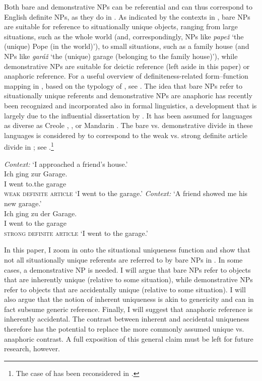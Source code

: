 \documentclass[output=paper,colorlinks,citecolor=brown,newtxmath]{langscibook}
\begin{document}
\noindent Both bare and demonstrative NPs can be referential and can thus correspond to English definite NPs, as they do in . As indicated by the contexts in , bare NPs are suitable for reference to situationally unique objects, ranging from large situations, such as the whole world (and, correspondingly, NPs like \textit{papež} `the (unique) Pope (in the world)'), to small situations, such as a family house (and NPs like \textit{garáž} `the (unique) garage (belonging to the family house)'), while demonstrative NPs are suitable for deictic reference (left aside in this paper) or anaphoric reference. For a useful overview of definiteness-related form--function mapping in , based on the typology of \citet{Hawkins1978}, see \citet[chapter 3]{Belicova.Uhlirova1996}. The idea that bare NPs refer to situationally unique referents and demonstrative NPs are anaphoric has recently been recognized and incorporated also in formal linguistics, a development that is largely due to the influential dissertation by \citet{Schwarz2009}. It has been assumed for languages as diverse as  Creole \citep{Wespel2008},  \citep{Arkoh.Matthewson2013}, or Mandarin  \citep{Jenks2018}. The bare vs. demonstrative divide in these languages is considered by \citet{Schwarz2013} to correspond to the weak vs. strong definite article divide in ; see .\footnote{The case of  has been reconsidered in \citet{Bombi2018}.}


\ea \label{simik:ex:ger:weak-strong}\ea\textit{Context:} `I approached a friend's house.'\label{simik:ex:ger:weak-strong-a}\\
\gll Ich ging zur Garage.\\
I went to.the garage\\\hfill\textsc{weak definite article}
\glt `I went to the garage.'
\ex \textit{Context:} `A friend showed me his new garage.'\label{simik:ex:ger:weak-strong-b}\\
\gll Ich ging zu der Garage.\\
I went to the garage\\\hfill\textsc{strong definite article}
\glt `I went to the garage.'
\z\z\largerpage[2]

\noindent In this paper, I zoom in onto the situational uniqueness function and show that not all situationally unique referents are referred to by bare NPs in . In some cases, a demonstrative NP is needed. I will argue that bare NPs refer to objects that are inherently unique (relative to some situation), while demonstrative NPs refer to objects that are accidentally unique (relative to some situation). I will also argue that the notion of inherent uniqueness is akin to genericity and can in fact subsume generic reference. Finally, I will suggest that anaphoric reference is inherently accidental. The contrast between inherent and accidental uniqueness therefore has the potential to replace the more commonly assumed unique vs. anaphoric contrast. A full exposition of this general claim must be left for future research, however.
\end{document}
